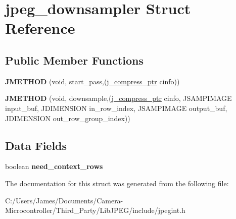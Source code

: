 \hypertarget{structjpeg__downsampler}{}\section{jpeg\+\_\+downsampler Struct Reference}
\label{structjpeg__downsampler}
\subsection*{Public Member Functions}
\begin{DoxyCompactItemize}
\item 
\mbox{\label{structjpeg__downsampler_a3176e0fbee668d7d69c6574d1b14880c}} 
{\bfseries J\+M\+E\+T\+H\+OD} (void, start\+\_\+pass,(\hyperlink{structjpeg__compress__struct}{j\+\_\+compress\+\_\+ptr} cinfo))
\item 
\mbox{\label{structjpeg__downsampler_a7d2090051a516936b7c5169791f0000e}} 
{\bfseries J\+M\+E\+T\+H\+OD} (void, downsample,(\hyperlink{structjpeg__compress__struct}{j\+\_\+compress\+\_\+ptr} cinfo, J\+S\+A\+M\+P\+I\+M\+A\+GE input\+\_\+buf, J\+D\+I\+M\+E\+N\+S\+I\+ON in\+\_\+row\+\_\+index, J\+S\+A\+M\+P\+I\+M\+A\+GE output\+\_\+buf, J\+D\+I\+M\+E\+N\+S\+I\+ON out\+\_\+row\+\_\+group\+\_\+index))
\end{DoxyCompactItemize}
\subsection*{Data Fields}
\begin{DoxyCompactItemize}
\item 
\mbox{\label{structjpeg__downsampler_ad52e3e87172ede3b59aaf3cfcf736592}} 
boolean {\bfseries need\+\_\+context\+\_\+rows}
\end{DoxyCompactItemize}


The documentation for this struct was generated from the following file\+:\begin{DoxyCompactItemize}
\item 
C\+:/\+Users/\+James/\+Documents/\+Camera-\/\+Microcontroller/\+Third\+\_\+\+Party/\+Lib\+J\+P\+E\+G/include/jpegint.\+h\end{DoxyCompactItemize}
